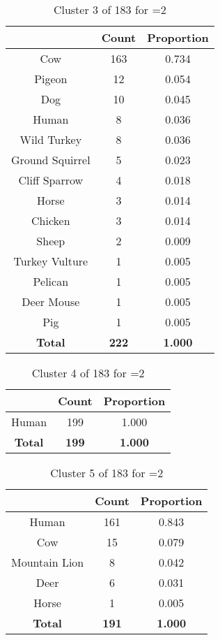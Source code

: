 \begin{table}[ht!]
\centering
\begin{tabular}{|c|c|c|}
\hline
\bf \Spec{} &\bf Count &\bf Proportion\\ \hline \hline
Cow & 163 & 0.734\\ \hline
Pigeon & 12 & 0.054\\ \hline
Dog & 10 & 0.045\\ \hline
Human & 8 & 0.036\\ \hline
Wild Turkey & 8 & 0.036\\ \hline
Ground Squirrel & 5 & 0.023\\ \hline
Cliff Sparrow & 4 & 0.018\\ \hline
Horse & 3 & 0.014\\ \hline
Chicken & 3 & 0.014\\ \hline
Sheep & 2 & 0.009\\ \hline
Turkey Vulture & 1 & 0.005\\ \hline
Pelican & 1 & 0.005\\ \hline
Deer Mouse & 1 & 0.005\\ \hline
Pig & 1 & 0.005\\ \hline
\hline
\bf Total & \bf 222 & \bf 1.000\\ \hline
\end{tabular}
\label{tab:cluster:3:2}
\caption{Cluster 3 of 183 for \minneigh{}=2}
\end{table}

\begin{table}[ht!]
\centering
\begin{tabular}{|c|c|c|}
\hline
\bf \Spec{} &\bf Count &\bf Proportion\\ \hline \hline
Human & 199 & 1.000\\ \hline
\hline
\bf Total & \bf 199 & \bf 1.000\\ \hline
\end{tabular}
\label{tab:cluster:4:2}
\caption{Cluster 4 of 183 for \minneigh{}=2}
\end{table}

\begin{table}[ht!]
\centering
\begin{tabular}{|c|c|c|}
\hline
\bf \Spec{} &\bf Count &\bf Proportion\\ \hline \hline
Human & 161 & 0.843\\ \hline
Cow & 15 & 0.079\\ \hline
Mountain Lion & 8 & 0.042\\ \hline
Deer & 6 & 0.031\\ \hline
Horse & 1 & 0.005\\ \hline
\hline
\bf Total & \bf 191 & \bf 1.000\\ \hline
\end{tabular}
\label{tab:cluster:5:2}
\caption{Cluster 5 of 183 for \minneigh{}=2}
\end{table}

